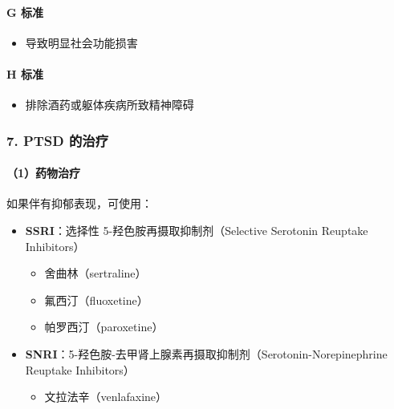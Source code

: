\documentclass[
  chinese,
  9pt,
  a4paper,
]{ctexart}
\providecommand{\tightlist}{%
  \setlength{\itemsep}{0pt}\setlength{\parskip}{0pt}}
\begin{document}
\paragraph{G 标准}\label{g-ux6807ux51c6}

\begin{itemize}
\tightlist
\item
  导致明显社会功能损害
\end{itemize}

\paragraph{H 标准}\label{h-ux6807ux51c6}

\begin{itemize}
\tightlist
\item
  排除酒药或躯体疾病所致精神障碍
\end{itemize}

\subsubsection{7. PTSD 的治疗}\label{ptsd-ux7684ux6cbbux7597}

\paragraph{（1）药物治疗}\label{ux836fux7269ux6cbbux7597-1}

如果伴有抑郁表现，可使用：

\begin{itemize}
\item
  \textbf{SSRI}：选择性 5-羟色胺再摄取抑制剂（Selective Serotonin
  Reuptake Inhibitors）

  \begin{itemize}
  \tightlist
  \item
    舍曲林（sertraline）
  \item
    氟西汀（fluoxetine）
  \item
    帕罗西汀（paroxetine）
  \end{itemize}
\item
  \textbf{SNRI}：5-羟色胺-去甲肾上腺素再摄取抑制剂（Serotonin-Norepinephrine
  Reuptake Inhibitors）

  \begin{itemize}
  \tightlist
  \item
    文拉法辛（venlafaxine）
  \end{itemize}
\end{itemize}
\end{document}
